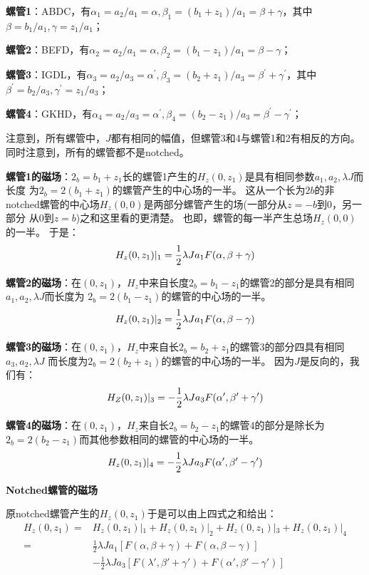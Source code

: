 \textbf{螺管1}：ABDC，有$\alpha_1=a_2/a_1=\alpha,\beta_1=(b_1+z_1)/a_1=\beta+\gamma$，其中
$\beta=b_1/a_1,\gamma=z_1/a_1$；

\textbf{螺管2}：BEFD，有$\alpha_2=a_2/a_1=\alpha,\beta_2=(b_1-z_1)/a_1=\beta-\gamma$；

\textbf{螺管3}：IGDL，有$\alpha_3=a_2/a_3=\alpha^\prime,\beta_3=(b_2+z_1)/a_3=\beta^\prime+\gamma^\prime$，其中$\beta^\prime=b_2/a_3,\gamma^\prime=z_1/a_3$；

\textbf{螺管4}：GKHD，有$\alpha_4=a_2/a_3=\alpha^\prime,\beta_4=(b_2-z_1)/a_3=\beta^\prime-\gamma^\prime$；

注意到，所有螺管中，$J$都有相同的幅值，但螺管3和4与螺管1和2有相反的方向。同时注意到，所有的螺管都不是notched。

\textbf{螺管1的磁场}：$2_b=b_1+z_1$长的螺管1产生的$H_z(0, z_1)$是具有相同参数$a_1, a_2,\lambda J$而长度
为$2_b = 2(b_1+z_1)$的螺管产生的中心场的一半。
这从一个长为$2b$的非notched螺管的中心场$H_z(0, 0)$是两部分螺管产生的场(一部分从$z=−b$到$0$，另一部分
从$0$到$z=b$)之和这里看的更清楚。
也即，螺管的每一半产生总场$H_z(0, 0)$的一半。 于是：
$$
H_{z}(0,z_{1})|_{1}=\frac{1}{2}\lambda Ja_{1}F(\alpha,\beta+\gamma)\\%
$$

\textbf{螺管2的磁场}：在$(0, z_1)$，$H_z$中来自长度$2_b = b_1−z_1$的螺管2的部分是具有相同$a_1, a_2,\lambda J$而长度为
$2_b = 2(b_1−z_1)$的螺管的中心场的一半。
$$
H_{z}(0,z_{1})|_{2}=\frac{1}{2}\lambda Ja_{1}F(\alpha,\beta-\gamma)\\%
$$

\textbf{螺管3的磁场}：在$(0, z_1)$，$H_z$中来自长$2_b=b_2+z_1$的螺管3的部分四具有相同$a_3, a_2,\lambda J$
而长度为$2_b=2(b_2+z_1)$的螺管的中心场的一半。
因为$J$是反向的，我们有：
$$
H_{Z}(0,z_{1})|_{3}=-\frac{1}{2}\lambda Ja_{3}F(\alpha',\beta'+\gamma')\\%
$$

\textbf{螺管4的磁场}：在$(0, z_1)$，$H_z$来自长$2_b = b_2−z_1$的螺管4的部分是除长为$2_b = 2(b_2−z_1)$而其他参数相同的螺管的中心场的一半。
$$
H_{z}(0,z_{1})|_{4}=-\frac{1}{2}\lambda Ja_{3}F(\alpha',\beta'-\gamma')\\%
$$

\textbf{Notched螺管的磁场}

原notched螺管产生的$H_z(0,z_1)$于是可以由上四式之和给出：
\begin{equation}%
\begin{split}
 H_{z}(0,z_{1}) =&H_{z}(0,z_{1})|_{1}+H_{z}(0,z_{1})|_{2}+H_{z}(0,z_{1})|_{3}+H_{z}(0,z_{1})|_{4} \\
=&\frac{1}{2}\lambda J a_{1}[F(\alpha,\beta+\gamma)+F(\alpha,\beta-\gamma)] \\%
&-\frac{1}{2}\lambda J a_{3}[F(\lambda',\beta'+\gamma')+F(\alpha',\beta'-\gamma')]
\end{split}
\end{equation}
\newpage



